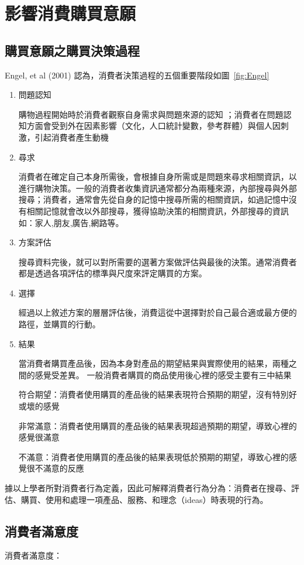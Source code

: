 \section{影響消費購買意願}
\subsection{購買意願之購買決策過程}
Engel, et al (2001) 認為，消費者決策過程的五個重要階段如圖~\ref{fig:Engel}
\begin{enumerate}
\item 問題認知

購物過程開始時於消費者觀察自身需求與問題來源的認知 ；消費者在問題認知方面會受到外在因素影響（文化，人口統計變數，參考群體）與個人因刺激，引起消費者產生動機

\item 尋求

消費者在確定自己本身所需後，會根據自身所需或是問題來尋求相關資訊，以進行購物決策。一般的消費者收集資訊通常都分為兩種來源，內部搜尋與外部搜尋；消費者，通常會先從自身的記憶中搜尋所需的相關資訊，如過記憶中沒有相關記憶就會改以外部搜尋，獲得協助決策的相關資訊，外部搜尋的資訊如：家人,朋友,廣告,網路等。
           
\item 方案評估

搜尋資料完後，就可以對所需要的選著方案做評估與最後的決策。通常消費者都是透過各項評估的標準與尺度來評定購買的方案。

\item 選擇

經過以上敘述方案的層層評估後，消費這從中選擇對於自己最合適或最方便的路徑，並購買的行動。

\item 結果 

當消費者購買產品後，因為本身對產品的期望結果與實際使用的結果，兩種之間的感覺受差異。
一般消費者購買的商品使用後心裡的感受主要有三中結果

符合期望：消費者使用購買的產品後的結果表現符合預期的期望，沒有特別好或壞的感覺

非常滿意：消費者使用購買的產品後的結果表現超過預期的期望，導致心裡的感覺很滿意

不滿意：消費者使用購買的產品後的結果表現低於預期的期望，導致心裡的感覺很不滿意的反應
\end{enumerate}

據以上學者所對消費者行為定義，因此可解釋消費者行為分為：消費者在搜尋、評估、購買、使用和處理一項產品、服務、和理念（ideas）時表現的行為。
\subsection{消費者滿意度}
消費者滿意度：

